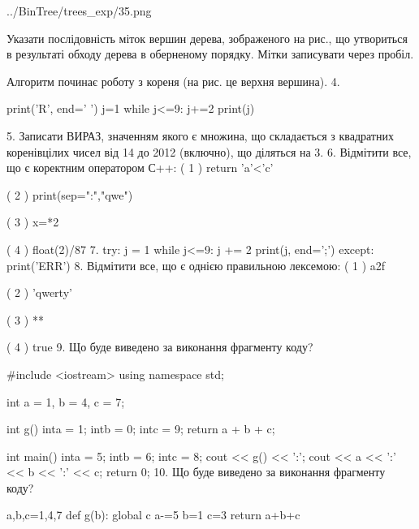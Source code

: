 \documentclass[11pt]{article}
\begin{document}
\begin{center}
	{../BinTree/trees_exp/35.png}
\end{center}
Указати послідовність міток вершин дерева, зображеного на рис., що утвориться в результаті обходу дерева в оберненому порядку. Мітки записувати через пробіл.\par Алгоритм починає роботу з кореня (на рис. це верхня вершина).
\vspace{5mm}
4. 

print('R', end=' ')
j=1
while j<=9:
    j+=2
print(j)

\vspace{5mm}
5. 
Записати ВИРАЗ, значенням якого є множина, що складається з квадратних коренівцілих чисел від 14 до 2012 (включно), що діляться на 3.\vspace{5mm}
6. %
Відмітити все, що є коректним оператором С++:
( 1 ) return 'a'<'c'

( 2 ) print(sep=":","qwe")

( 3 ) x=*2

( 4 ) float(2)/87
\vspace{5mm}
7. 
try:
    j = 1
    while j<=9:
        j += 2
    print(j, end=';')
except:
    print('ERR')
\vspace{5mm}
8. %
Відмітити все, що є однією правильною лексемою:
( 1 ) a2f

( 2 ) 'qwerty'

( 3 ) **

( 4 ) true
\vspace{5mm}
9. Що буде виведено за виконання фрагменту коду?

#include <iostream>
using namespace std;

int a = 1, b = 4, c = 7;

int g(){
    inta = 1;
    intb = 0;
    intc = 9;
    return a + b + c;
}

int main(){
    inta = 5;
    intb = 6;
    intc = 8;
    cout << g() << ':';
    cout << a << ':' << b << ':' << c;
    return 0;
}
\vspace{5mm}
10. Що буде виведено за виконання фрагменту коду?

a,b,c=1,4,7
def g(b):
global c    a-=5
    b=1
    c=3
    return a+b+c
\end{document}
